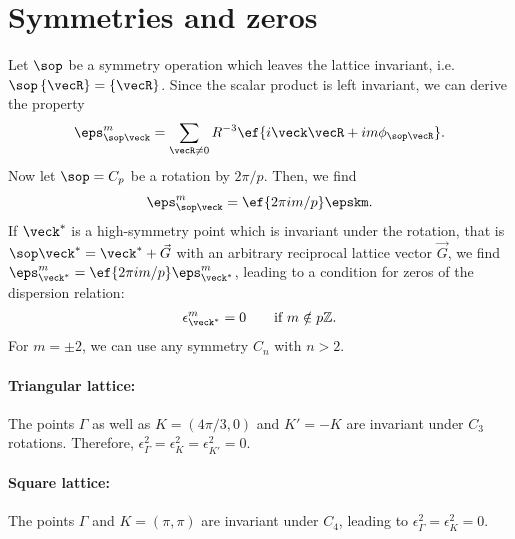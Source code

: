 \section{Symmetries and zeros}
Let $\sop$ be a symmetry operation which leaves the lattice invariant, i.e. $\sop \, \{ \vecR \} = \{ \vecR \}$.
Since the scalar product is left invariant,
we can derive the property
\begin{align}
    \eps_{\sop\veck}^m = \sum_{\vecR\ne 0} R^{-3} \ef{i\veck \vecR + i m \phi_{\sop\vecR}}.
\end{align}
Now let $\sop=C_p$ be a rotation by $2\pi/p$. Then, we find
\begin{align}
    \eps_{\sop \veck}^m = \ef{2\pi i m/p} \epskm.
\end{align}
If $\veck^*$ is a high-symmetry point which is invariant under the rotation, that is
$\sop\veck^* = \veck^* + \vec{G}$ with an arbitrary reciprocal lattice vector $\vec{G}$, we find $\eps_{\veck^*}^m = \ef{2\pi i m/p} \eps_{\veck^*}^m$, leading to a condition for zeros of the dispersion relation:
\begin{align}
    \epsilon^m_{\veck^*} = 0\qquad\text{if } m \notin p\mathbb{Z}.
\end{align}
For $m=\pm 2$, we can use any symmetry $C_n$ with $n>2$.


\paragraph{Triangular lattice:} The points $\Gamma$ as well as
$K=(4\pi/3,0)$ and $K'=- K$ are invariant under $C_3$ rotations. Therefore,
$\epsilon^2_\Gamma=\epsilon^2_K=\epsilon^2_{K'}=0$.

\paragraph{Square lattice:} The points $\Gamma$ and $K=(\pi,\pi)$ are
invariant under $C_4$, leading to $\epsilon^2_\Gamma=\epsilon^2_K=0$.


